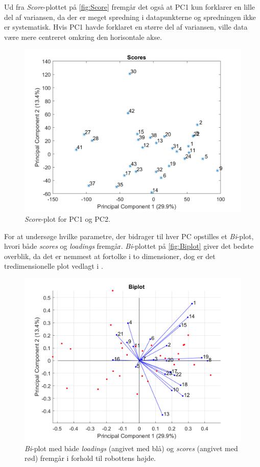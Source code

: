 \newpage
Ud fra \textit{Score}-plottet på \autoref{fig:Score} fremgår det også at PC1 kun forklarer en lille del af variansen, da der er meget spredning i datapunkterne og spredningen ikke er systematisk. Hvis PC1 havde forklaret en større del af variansen, ville data være mere centreret omkring den horisontale akse.
%
\begin{figure}[H]
\centering
\includegraphics[width=\textwidth]{Figure/DatabehandlingSkalaer/PCAfigures/Scores}
\caption{\textit{Score}-plot for PC1 og PC2.}
\label{fig:Score}
\end{figure}
\newpage
\noindent
%
For at undersøge hvilke parametre, der bidrager til hver PC opstilles et \textit{Bi}-plot, hvori både \textit{scores} og \textit{loadings} fremgår. \textit{Bi}-plottet på \autoref{fig:Biplot} giver det bedste overblik, da det er nemmest at fortolke i to dimensioner, dog er det tredimensionelle plot vedlagt i . 
%
\begin{figure}[H]
\centering
\includegraphics[width=\textwidth]{Figure/DatabehandlingSkalaer/PCAfigures/Biplot}
\caption{\textit{Bi}-plot med både \textit{loadings} (angivet med blå) og \textit{scores} (angivet med rød) fremgår i forhold til robottens højde.}
\label{fig:Biplot}
\end{figure}
